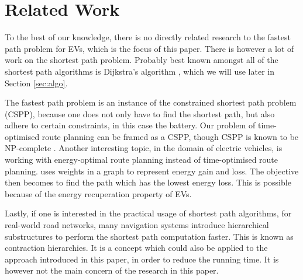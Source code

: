 \section{Related Work}\label{sec:relatedwork}
To the best of our knowledge, there is no directly related research to the fastest path problem for EVs, which is the focus of this paper. There is however a lot of work on the shortest path problem. Probably best known amongst all of the shortest path algorithms is Dijkstra's algorithm \cite{dijkstra1959note}, which we will use later in Section \ref{sec:algo}.

The fastest path problem is an instance of the constrained shortest path problem (CSPP)\cite{joksch1966shortest}, because one does not only have to find the shortest path, but also adhere to certain constraints, in this case the battery. Our problem of time-optimised route planning can be framed as a CSPP, though CSPP is known to be NP-complete \cite{Garey:1979:CIG:578533}. Another interesting topic, in the domain of electric vehicles, is working with energy-optimal route planning instead of time-optimised route planning. \cite{artmeier2010shortest} uses weights in a graph to represent energy gain and loss. The objective then becomes to find the path which has the lowest energy loss. This is possible because of the energy recuperation property of EVs.

Lastly, if one is interested in the practical usage of shortest path algorithms, for real-world road networks, many navigation systems introduce hierarchical substructures to perform the shortest path computation faster. This is known as contraction hierarchies. It is a concept which could also be applied to the approach introduced in this paper, in order to reduce the running time. It is however not the main concern of the research in this paper.